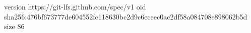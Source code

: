 version https://git-lfs.github.com/spec/v1
oid sha256:476bf673777de604552fc118630bc2d9c6eceec0ac2df58a084708e898062b5d
size 86
